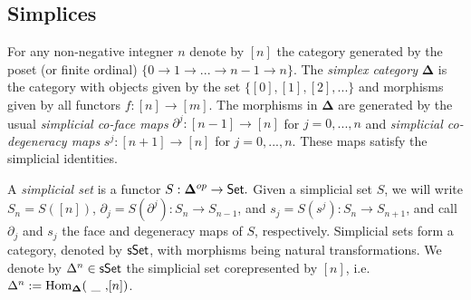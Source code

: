 
\subsection{Simplices} 
For any non-negative integner $n$ denote by $[n]$ the category generated by the poset (or finite ordinal) $\{0 \to 1 \to ... \to n-1 \to n\}$. The \textit{simplex category} $\mathbf{\Delta}$ is the category with objects given by the set $\{ [0], [1], [2], ...\}$ and morphisms given by all functors $f: [n] \to [m]$. The morphisms in $\mathbf{\Delta}$ are generated by the usual
\textit{simplicial co-face maps} $\partial^j: [n-1] \to [n]$ for $j=0,...,n$ and \textit{simplicial co-degeneracy maps} $s^j: [n+1] \to [n]$ for $j=0,...,n.$ These maps satisfy the simplicial identities.

A \textit{simplicial set} is a functor $S: \mathbf{\Delta}^{op} \to \mathsf{Set}.$ Given a simplicial set $S$, we will write $S_n= S( [n] )$, $\partial_j = S( \partial^j): S_n \to S_{n-1}$, and $s_j= S(s^j): S_n \to S_{n+1}$, and call $\partial_j$ and $s_j$ the face and degeneracy maps of $S$, respectively. Simplicial sets form a category, denoted by $\mathsf{sSet}$, with morphisms being natural transformations.  We denote by $\Delta^n \in \mathsf{sSet}$ the simplicial set corepresented by $[n]$, i.e. $\Delta^n:= \mathrm{Hom}_{\mathbf{\Delta}}(\text{ \_ ,}  [n])$. 
